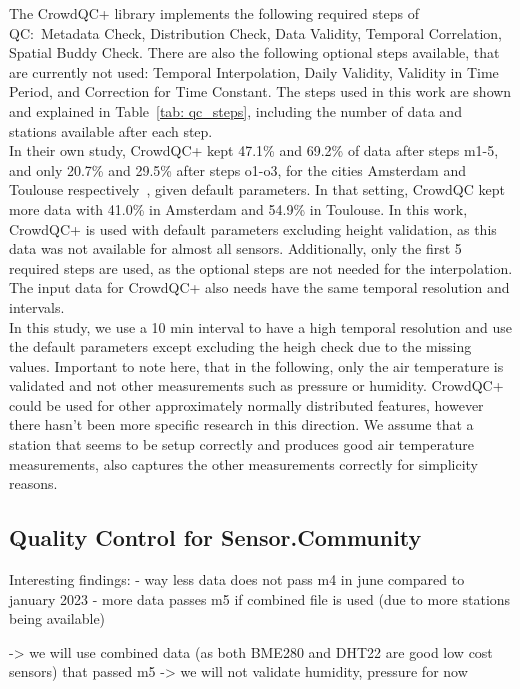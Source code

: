 The CrowdQC+ library implements the following required steps of QC:\ Metadata Check, Distribution Check, Data Validity, Temporal Correlation, Spatial Buddy Check. There are also the following optional steps available, that are currently not used: Temporal Interpolation, Daily Validity, Validity in Time Period, and Correction for Time Constant.
The steps used in this work are shown and explained in Table~\ref{tab: qc_steps}, including the number of data and stations available after each step.\\
In their own study, CrowdQC+ kept 47.1\% and 69.2\% of data after steps m1-5, and only 20.7\% and 29.5\% after steps o1-o3, for the cities Amsterdam and Toulouse respectively~\cite{fenner2021crowdqc+}, given default parameters. In that setting, CrowdQC kept more data with 41.0\% in Amsterdam and 54.9\% in Toulouse. In this work, CrowdQC+ is used with default parameters excluding height validation, as this data was not available for almost all sensors. Additionally, only the first 5 required steps are used, as the optional steps are not needed for the interpolation. The input data for CrowdQC+ also needs have the same temporal resolution and intervals.\\
In this study, we use a 10 min interval to have a high temporal resolution and use the default parameters except excluding the heigh check due to the missing values. Important to note here, that in the following, only the air temperature is validated and not other measurements such as pressure or humidity. CrowdQC+ could be used for other approximately normally distributed features, however there hasn't been more specific research in this direction. We assume that a station that seems to be setup correctly and produces good air temperature measurements, also captures the other measurements correctly for simplicity reasons.

\subsection{Quality Control for Sensor.Community}

Interesting findings:
- way less data does not pass m4 in june compared to january 2023
- more data passes m5 if combined file is used (due to more stations being available)

-> we will use combined data (as both BME280 and DHT22 are good low cost sensors) that passed m5
-> we will not validate humidity, pressure for now

